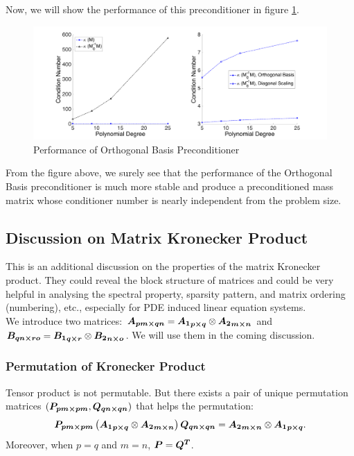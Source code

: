 Now, we will show the performance of this preconditioner in figure \ref{orth_precond}.
\begin{figure}[H]
	\centering
	\includegraphics[width=.95\textwidth]{mass_orth_precond}
	\caption{Performance of Orthogonal Basis Preconditioner}
	\label{orth_precond}
\end{figure}
From the figure above, we surely see that the performance of the Orthogonal Basis preconditioner is much more stable and produce a preconditioned mass matrix whose conditioner number is nearly independent from the problem size. \\

\subsection{Discussion on Matrix Kronecker Product}
This is an additional discussion on the properties of the matrix Kronecker product. They could reveal the block structure of matrices and could be very helpful in analysing the spectral property, sparsity pattern, and matrix ordering (numbering), etc., especially for PDE induced linear equation systems. \\

We introduce two matrices: $\boldsymbol{A_{pm\times qn}} = \boldsymbol{{A_1}_{p\times q}} \otimes \boldsymbol{{A_2}_{m\times n}}$ and $\boldsymbol{B_{qn\times ro}} = \boldsymbol{{B_1}_{q\times r}} \otimes \boldsymbol{{B_2}_{n\times o}}$. We will use them in the coming discussion. \\

\subsubsection{Permutation of Kronecker Product}
Tensor product is not permutable. But there exists a pair of unique permutation matrices $(\boldsymbol{P_{pm\times pm}},\boldsymbol{Q_{qn\times qn}})$ that helps the permutation: 
\begin{equation}
	\boldsymbol{P_{pm\times pm}}\left( \boldsymbol{{A_1}_{p\times q}} \otimes \boldsymbol{{A_2}_{m\times n}}\right) \boldsymbol{Q_{qn\times qn}} = \boldsymbol{{A_2}_{m\times n}} \otimes  \boldsymbol{{A_1}_{p\times q}}.
\end{equation} 
Moreover, when $p=q$ and $m=n$, $\boldsymbol{P} = \boldsymbol{Q^T}$. \\

